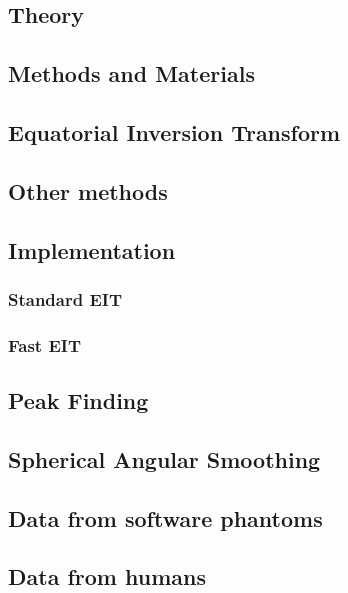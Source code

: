 \documentclass{bioinfo}
\begin{document}
\subsection{Theory}

\begin{methods}

\section{Methods and Materials}

\subsection{Equatorial Inversion Transform}

\subsection{Other methods}

\subsection{Implementation }

\subsubsection{Standard EIT\label{sub:Standard-EIT}}

\subsubsection{Fast EIT}

\subsection{Peak Finding\label{sub:Peak-Finding}}

\subsection{Spherical Angular Smoothing\label{sub:Spherical-Angular-Smoothing}}

\subsection{Data from software phantoms}

\subsection{Data from humans}

\end{methods}
\end{document}
